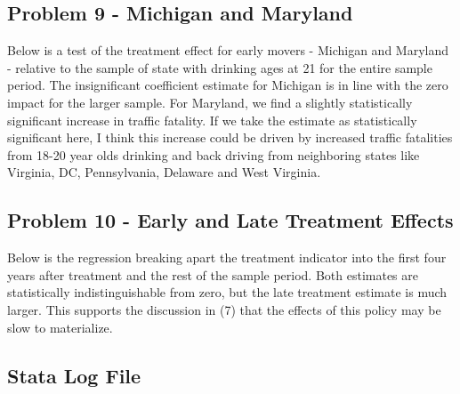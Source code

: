 \documentclass{article}
\begin{document}
\begin{center}

\end{center}

\pagebreak

\subsection*{Problem 9 - Michigan and Maryland}

Below is a test of the treatment effect for early movers - Michigan and Maryland - relative to the sample of state with drinking ages at 21 for the entire sample period.  The insignificant coefficient estimate for Michigan is in line with the zero impact for the larger sample.  For Maryland, we find a slightly statistically significant increase in traffic fatality.  If we take the estimate as statistically significant here, I think this increase could be driven by increased traffic fatalities from 18-20 year olds drinking and back driving from neighboring states like Virginia, DC, Pennsylvania, Delaware and West Virginia. 

\begin{center}

\end{center}

\subsection*{Problem 10 - Early and Late Treatment Effects}

Below is the regression breaking apart the treatment indicator into the first four years after treatment and the rest of the sample period.  Both estimates are statistically indistinguishable from zero, but the late treatment estimate is much larger.  This supports the discussion in (7) that the effects of this policy may be slow to materialize.

\begin{center}

\end{center}

\begin{landscape}
\section{Stata Log File}

\end{landscape}
\end{document}
